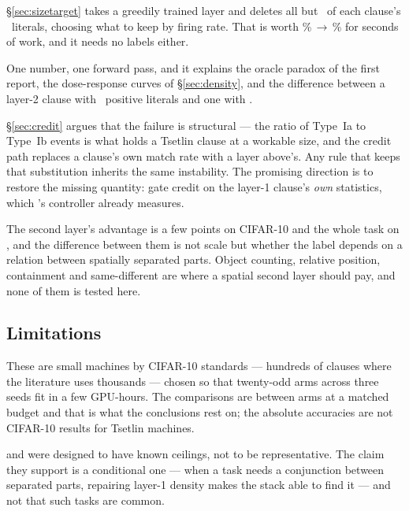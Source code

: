  \S\ref{sec:sizetarget} takes a
greedily trained layer and deletes all but \sizeBestTarget\ of each clause's
\densityGreedySize\ literals, choosing what to keep by firing rate. That is worth
\accMctm{}\%\,$\to$\,\sizeBestAcc{}\% for seconds of work, and it needs no labels either.

 One number, one forward pass, and it
explains the oracle paradox of the first report, the dose-response curves of
\S\ref{sec:density}, and the difference between a layer-2 clause with
\posMctmRandomCalib\ positive literals and one with \posMctm.

 \S\ref{sec:credit} argues
that the failure is structural --- the ratio of Type~Ia to Type~Ib events is what holds a
Tsetlin clause at a workable size, and the credit path replaces a clause's own match rate with
a layer above's. Any rule that keeps that substitution inherits the same instability. The
promising direction is to restore the missing quantity: gate credit on the layer-1 clause's
\emph{own} statistics, which \ideaB's controller already measures.

 The second layer's advantage is a few points
on CIFAR-10 and the whole task on , and the difference between them is not scale
but whether the label depends on a relation between spatially separated parts. Object
counting, relative position, containment and same-different are where a spatial second layer
should pay, and none of them is tested here.

\subsection{Limitations}

 These are small machines by CIFAR-10 standards --- hundreds of clauses where the
literature uses thousands --- chosen so that twenty-odd arms across three seeds fit in a few
GPU-hours. The comparisons are between arms at a matched budget and that is what the
conclusions rest on; the absolute accuracies are not CIFAR-10 results for Tsetlin machines.

  and  were designed to have known ceilings,
not to be representative. The claim they support is a conditional one --- when a task needs a
conjunction between separated parts, repairing layer-1 density makes the stack able to find it
--- and not that such tasks are common.

